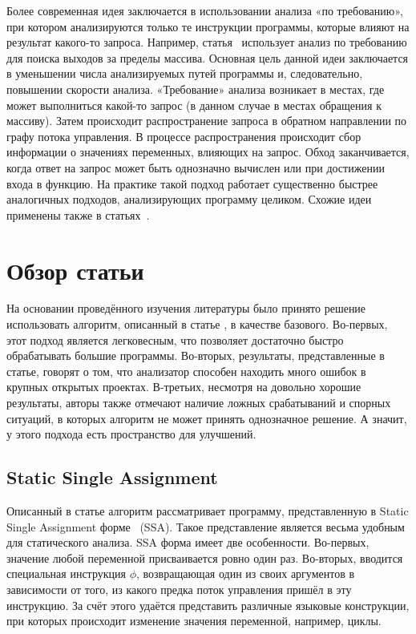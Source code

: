 Более современная идея заключается в использовании анализа «по
требованию», при котором анализируются только те инструкции программы,
которые влияют на результат какого-то запроса. Например,
статья~\cite{le2008marple} использует анализ по требованию для поиска
выходов за пределы массива. Основная цель данной идеи заключается в
уменьшении числа анализируемых путей программы и, следовательно,
повышении скорости анализа. «Требование» анализа возникает в местах,
где может выполниться какой-то запрос (в данном случае в местах
обращения к массиву). Затем происходит распространение запроса в
обратном направлении по графу потока управления. В процессе
распространения происходит сбор информации о значениях переменных,
влияющих на запрос. Обход заканчивается, когда ответ на запрос может
быть однозначно вычислен или при достижении входа в функцию. На
практике такой подход работает существенно быстрее аналогичных
подходов, анализирующих программу целиком. Схожие идеи применены также
в статьях~\cite{ding2012detection, ding2014abor, li2010practical}.

\section{Обзор статьи~\cite{li2010practical}}

На основании проведённого изучения литературы было принято решение
использовать алгоритм, описанный в статье \cite{li2010practical}, в
качестве базового. Во-первых, этот подход является легковесным, что
позволяет достаточно быстро обрабатывать большие программы. Во-вторых,
результаты, представленные в статье, говорят о том, что анализатор
способен находить много ошибок в крупных открытых проектах. В-третьих,
несмотря на довольно хорошие результаты, авторы также отмечают наличие
ложных срабатываний и спорных ситуаций, в которых алгоритм не может
принять однозначное решение. А значит, у этого подхода есть
пространство для улучшений.

\subsection{Static Single Assignment}

Описанный в статье алгоритм рассматривает программу, представленную в
Static Single Assignment форме~\cite{cytron1991efficiently} (SSA). Такое
представление является весьма удобным для статического анализа. SSA
форма имеет две особенности. Во-первых, значение любой переменной
присваивается ровно один раз. Во-вторых, вводится специальная
инструкция $\phi$, возвращающая один из своих аргументов в зависимости
от того, из какого предка поток управления пришёл в эту инструкцию. За
счёт этого удаётся представить различные языковые конструкции, при
которых происходит изменение значения переменной, например, циклы.


